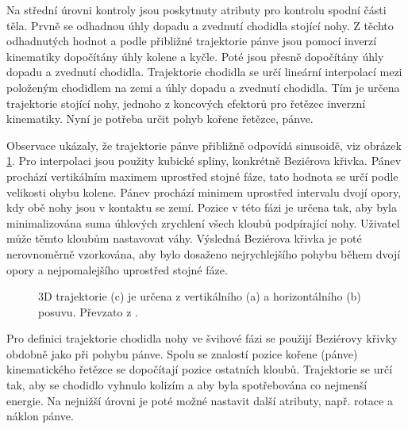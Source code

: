 Na střední úrovni kontroly jsou poskytnuty atributy pro kontrolu spodní části těla. Prvně se odhadnou úhly dopadu a zvednutí chodidla stojící nohy. Z těchto odhadnutých hodnot a podle přibližné trajektorie pánve jsou pomocí inverzí kinematiky dopočítány úhly kolene a kyčle. Poté jsou přesně dopočítány úhly dopadu a zvednutí chodidla. Trajektorie chodidla se určí lineární interpolací mezi položeným chodidlem na zemi a úhly dopadu a zvednutí chodidla. Tím je určena trajektorie stojící nohy, jednoho z koncových efektorů pro řetězec inverzní kinematiky. Nyní je potřeba určit pohyb kořene řetězce, pánve. 

Observace ukázaly, že trajektorie pánve přibližně odpovídá sinusoidě, viz obrázek \ref{chung_pelvis}. Pro interpolaci jsou použity kubické spliny, konkrétně Beziérova křivka. Pánev prochází vertikálním maximem uprostřed stojné fáze, tato hodnota se určí podle velikosti ohybu kolene. Pánev prochází minimem uprostřed intervalu dvojí opory, kdy obě nohy jsou v kontaktu se zemí. Pozice v této fázi je určena tak, aby byla minimalizována suma úhlových zrychlení všech kloubů podpírající nohy. Uživatel může těmto kloubům nastavovat váhy. Výsledná Beziérova křivka je poté nerovnoměrně vzorkována, aby bylo dosaženo nejrychlejšího pohybu během dvojí opory a nejpomalejšího uprostřed stojné fáze. 
\begin{figure}[h]
\begin{center}
\caption{3D trajektorie (c) je určena z vertikálního (a) a horizontálního (b) posuvu. Převzato z \cite{chung}.} \label{chung_pelvis}
\end{center}
\end{figure}
Pro definici trajektorie chodidla nohy ve švihové fázi se použijí Beziérovy křivky obdobně jako při pohybu pánve. Spolu se znalostí pozice kořene (pánve) kinematického řetězce se dopočítají pozice ostatních kloubů. Trajektorie se určí tak, aby se chodidlo vyhnulo kolizím a aby byla spotřebována co nejmenší energie. Na nejnižší úrovni je poté možné nastavit další atributy, např. rotace a náklon pánve.

